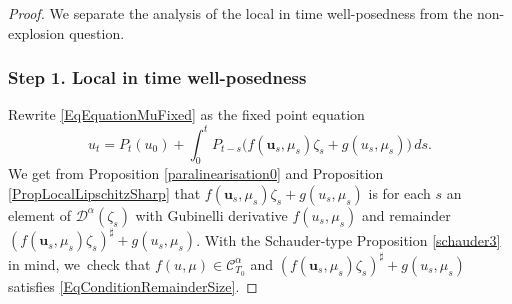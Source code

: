 \documentclass[JEP,XML,SOM,Unicode,published]{cedram}
\theoremstyle{definition}
\newcommand{\mcD}{\mathcal{D}}
\newcommand{\bsu}{\boldsymbol{u}}
\begin{document}
\begin{proof}
We separate the analysis of the local in time well-posedness from the non-explosion question. 

\subsubsection*{Step 1. Local in time well-posedness} Rewrite \eqref{EqEquationMuFixed} as the fixed point equation
\[
u_t = P_t (u_0) + \int_0^t P_{t-s}\bigl(f(\bsu_s,\mu_s)\zeta_s + g(u_s, \mu_s)\bigr)\,ds.
\]
We get from Proposition \ref{paralinearisation0} and Proposition \ref{PropLocalLipschitzSharp} that $f(\bsu_s,\mu_s)\zeta_s + g(u_s, \mu_s)$ is for each $s$ an element of $\mcD^\alpha(\zeta_s)$ with Gubinelli derivative $f(u_s,\mu_s)$ and remainder $(f(\bsu_s,\mu_s)\zeta_s)^\sharp + g(u_s,\mu_s)$. With the Schauder-type Proposition \ref{schauder3} in mind, we~check that $f(u,\mu)\in\mathscr{C}^\alpha_{T_0}$ and $(f(\bsu_s,\mu_s)\zeta_s)^\sharp + g(u_s,\mu_s)$ satisfies \eqref{EqConditionRemainderSize}.


\end{proof}
\end{document}
